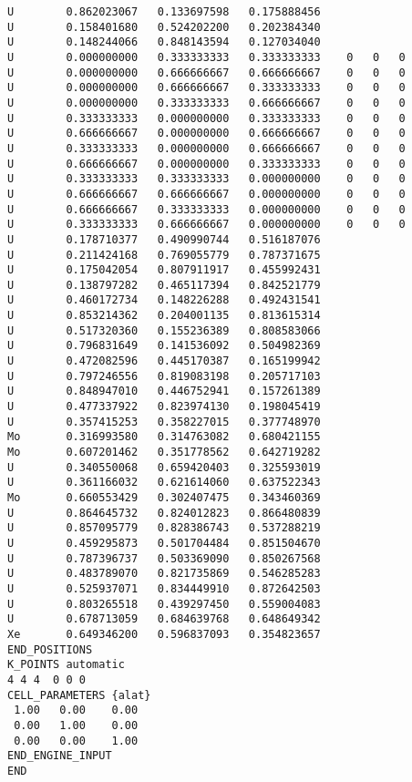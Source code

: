 \begin{lstlisting}
U        0.862023067   0.133697598   0.175888456
U        0.158401680   0.524202200   0.202384340
U        0.148244066   0.848143594   0.127034040
U        0.000000000   0.333333333   0.333333333    0   0   0
U        0.000000000   0.666666667   0.666666667    0   0   0
U        0.000000000   0.666666667   0.333333333    0   0   0
U        0.000000000   0.333333333   0.666666667    0   0   0
U        0.333333333   0.000000000   0.333333333    0   0   0
U        0.666666667   0.000000000   0.666666667    0   0   0
U        0.333333333   0.000000000   0.666666667    0   0   0
U        0.666666667   0.000000000   0.333333333    0   0   0
U        0.333333333   0.333333333   0.000000000    0   0   0
U        0.666666667   0.666666667   0.000000000    0   0   0
U        0.666666667   0.333333333   0.000000000    0   0   0
U        0.333333333   0.666666667   0.000000000    0   0   0
U        0.178710377   0.490990744   0.516187076
U        0.211424168   0.769055779   0.787371675
U        0.175042054   0.807911917   0.455992431
U        0.138797282   0.465117394   0.842521779
U        0.460172734   0.148226288   0.492431541
U        0.853214362   0.204001135   0.813615314
U        0.517320360   0.155236389   0.808583066
U        0.796831649   0.141536092   0.504982369
U        0.472082596   0.445170387   0.165199942
U        0.797246556   0.819083198   0.205717103
U        0.848947010   0.446752941   0.157261389
U        0.477337922   0.823974130   0.198045419
U        0.357415253   0.358227015   0.377748970
Mo       0.316993580   0.314763082   0.680421155
Mo       0.607201462   0.351778562   0.642719282
U        0.340550068   0.659420403   0.325593019
U        0.361166032   0.621614060   0.637522343
Mo       0.660553429   0.302407475   0.343460369
U        0.864645732   0.824012823   0.866480839
U        0.857095779   0.828386743   0.537288219
U        0.459295873   0.501704484   0.851504670
U        0.787396737   0.503369090   0.850267568
U        0.483789070   0.821735869   0.546285283
U        0.525937071   0.834449910   0.872642503
U        0.803265518   0.439297450   0.559004083
U        0.678713059   0.684639768   0.648649342
Xe       0.649346200   0.596837093   0.354823657
END_POSITIONS
K_POINTS automatic
4 4 4  0 0 0
CELL_PARAMETERS {alat}
 1.00   0.00    0.00
 0.00   1.00    0.00
 0.00   0.00    1.00
END_ENGINE_INPUT
END

\end{lstlisting}


